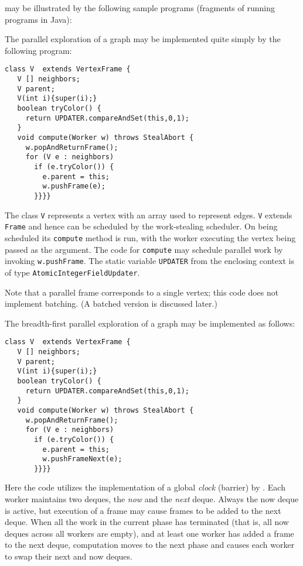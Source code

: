 \XWS{} may be illustrated by the following sample programs (fragments
of running programs in Java):

\begin{example} \label{example:dfs}
The parallel exploration of a graph may be implemented quite simply by the following program:
{\footnotesize
\begin{verbatim}
class V  extends VertexFrame {
   V [] neighbors;
   V parent;
   V(int i){super(i);}
   boolean tryColor() {
     return UPDATER.compareAndSet(this,0,1);
   }
   void compute(Worker w) throws StealAbort {
     w.popAndReturnFrame();
     for (V e : neighbors) 
       if (e.tryColor()) {
         e.parent = this;
         w.pushFrame(e);
       }}}}
\end{verbatim}}
The class {\tt V} represents a vertex with an array used to represent
edges. {\tt V} extends {\tt Frame} and hence can be scheduled by the
work-stealing scheduler. On being scheduled its {\tt compute} method
is run, with the worker executing the vertex being passed as the
argument. The code for {\tt compute} may schedule parallel work by
invoking {\tt w.pushFrame}. The static variable {\tt UPDATER} from the enclosing context is of type {\tt AtomicIntegerFieldUpdater}.

Note that a parallel frame corresponds to a single vertex; this code
does not implement batching. (A batched version is discussed later.)
\end{example}

\begin{example}[BFS] \label{example:bfs}
The breadth-first parallel exploration of a graph may be implemented
as follows:
{\footnotesize
\begin{verbatim}
class V  extends VertexFrame {
   V [] neighbors;
   V parent;
   V(int i){super(i);}
   boolean tryColor() {
     return UPDATER.compareAndSet(this,0,1);
   }
   void compute(Worker w) throws StealAbort {
     w.popAndReturnFrame();
     for (V e : neighbors) 
       if (e.tryColor()) {
         e.parent = this;
         w.pushFrameNext(e);
       }}}}
\end{verbatim}}

Here the code utilizes the implementation of a global {\em clock} (barrier)
by \XWS. Each worker maintains two deques, the {\em now} and the {\em
next} deque. Always the now deque is active, but execution of a frame
may cause frames to be added to the next deque.  When all the work in
the current phase has terminated (that is, all now deques across all
workers are empty), and at least one worker has added a frame to the
next deque, computation moves to the next phase and causes each worker
to swap their next and now deques.
\end{example}

